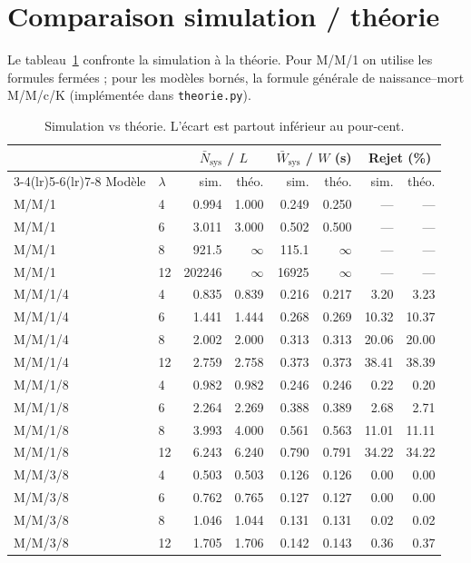 \documentclass[11pt,a4paper]{article}
\begin{document}
\section{Comparaison simulation / théorie}
\label{sec:compar}
Le tableau~\ref{tab:compar} confronte la simulation à la théorie. Pour M/M/1 on
utilise les formules fermées ; pour les modèles bornés, la formule générale de
naissance--mort M/M/c/K (implémentée dans \texttt{theorie.py}).

\begin{table}[h]
\centering
\small
\begin{tabular}{@{}llrrrrrr@{}}
\toprule
& & \multicolumn{2}{c}{$\bar N_{\text{sys}}$ / $L$} & \multicolumn{2}{c}{$\bar W_{\text{sys}}$ / $W$ (s)} & \multicolumn{2}{c}{Rejet (\%)} \\
\cmidrule(lr){3-4}\cmidrule(lr){5-6}\cmidrule(lr){7-8}
Modèle & $\lambda$ & sim. & théo. & sim. & théo. & sim. & théo. \\
\midrule
M/M/1   & 4  & 0.994 & 1.000 & 0.249 & 0.250 & --- & --- \\
M/M/1   & 6  & 3.011 & 3.000 & 0.502 & 0.500 & --- & --- \\
M/M/1   & 8  & 921.5 & $\infty$ & 115.1 & $\infty$ & --- & --- \\
M/M/1   & 12 & 202246 & $\infty$ & 16925 & $\infty$ & --- & --- \\
\midrule
M/M/1/4 & 4  & 0.835 & 0.839 & 0.216 & 0.217 & 3.20 & 3.23 \\
M/M/1/4 & 6  & 1.441 & 1.444 & 0.268 & 0.269 & 10.32 & 10.37 \\
M/M/1/4 & 8  & 2.002 & 2.000 & 0.313 & 0.313 & 20.06 & 20.00 \\
M/M/1/4 & 12 & 2.759 & 2.758 & 0.373 & 0.373 & 38.41 & 38.39 \\
\midrule
M/M/1/8 & 4  & 0.982 & 0.982 & 0.246 & 0.246 & 0.22 & 0.20 \\
M/M/1/8 & 6  & 2.264 & 2.269 & 0.388 & 0.389 & 2.68 & 2.71 \\
M/M/1/8 & 8  & 3.993 & 4.000 & 0.561 & 0.563 & 11.01 & 11.11 \\
M/M/1/8 & 12 & 6.243 & 6.240 & 0.790 & 0.791 & 34.22 & 34.22 \\
\midrule
M/M/3/8 & 4  & 0.503 & 0.503 & 0.126 & 0.126 & 0.00 & 0.00 \\
M/M/3/8 & 6  & 0.762 & 0.765 & 0.127 & 0.127 & 0.00 & 0.00 \\
M/M/3/8 & 8  & 1.046 & 1.044 & 0.131 & 0.131 & 0.02 & 0.02 \\
M/M/3/8 & 12 & 1.705 & 1.706 & 0.142 & 0.143 & 0.36 & 0.37 \\
\bottomrule
\end{tabular}
\caption{Simulation vs théorie. L'écart est partout inférieur au pour-cent.}
\label{tab:compar}
\end{table}
\end{document}
